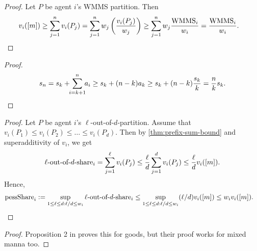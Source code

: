 \begin{proof}
Let $P$ be agent $i$'s WMMS partition. Then
\begin{align*}
v_i([m]) &\ge \sum_{j=1}^n v_i(P_j) = \sum_{j=1}^n w_j\left(\frac{v_i(P_j)}{w_j}\right)
    \relax\ge \sum_{j=1}^n w_j\frac{\mathrm{WMMS}_i}{w_i} = \frac{\mathrm{WMMS}_i}{w_i}.
\qedhere
\end{align*}
\end{proof}

\begin{proof}
\[ s_n = s_k + \!\!\sum_{i=k+1}^n \!\!a_i \ge s_k + (n-k)a_k \ge s_k + (n-k)\frac{s_k}{k}
= \frac{n}{k}s_k. \qedhere \]
\end{proof}

\begin{proof}
Let $P$ be agent $i$'s $\ell$-out-of-$d$-partition.
Assume \wLoG{} that $v_i(P_1) \le v_i(P_2) \le \ldots \le v_i(P_d)$.
Then by \cref{thm:prefix-sum-bound} and superadditivity of $v_i$, we get
\[ \ell\textrm{-out-of-}d\textrm{-share}_i = \sum_{j=1}^{\ell} v_i(P_j)
    \le \frac{\ell}{d}\sum_{j=1}^d v_i(P_j) \le \frac{\ell}{d}v_i([m]). \]
Hence,
\begin{align*}
\mathrm{pessShare}_i &:= \sup_{1 \le \ell \le d: \ell/d \le w_i} \ell\textrm{-out-of-}d\textrm{-share}_i
    \relax\le \sup_{1 \le \ell \le d: \ell/d \le w_i} (\ell/d)v_i([m])
    \relax\le w_iv_i([m]).
\qedhere
\end{align*}
\end{proof}

\begin{proof}
Proposition 2 in \citet{babaioff2023fair} proves this for goods,
but their proof works for mixed manna too.
\end{proof}


